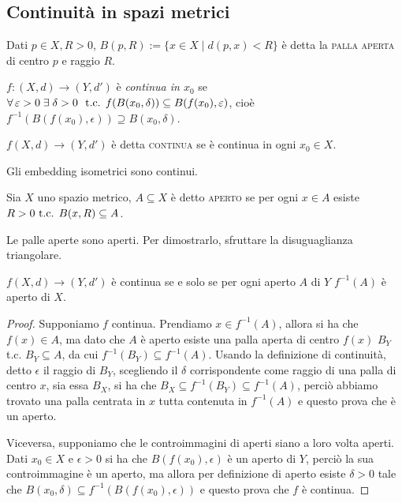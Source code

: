 \documentclass{article}
\begin{document}
\subsection{Continuità in spazi metrici}

\begin{defn}
    Dati $p \in X, R>0$, ${B(p, R):=\{ x \in X \mid d(p, x)<R\}}$ è detta la
    \textsc{palla aperta} di centro $p$ e raggio $R$.
\end{defn}

\begin{defn}
    ${f:(X, d) \rightarrow (Y, d')}$ è \textit{continua in $x_0$} se ${\forall
    \epsilon > 0 \; \exists \; \delta >0}\\\ \tc {f(B(x_0, \delta)) \subseteq
    B(f(x_0), \epsilon)}$, cioè ${f^{-1}(B(f(x_0), \epsilon)) \supseteq B(x_0,
    \delta)}$.
\end{defn}

\begin{defn}
    ${f(X, d) \rightarrow (Y, d')}$ è detta \textsc{continua} se è continua in
    ogni ${x_0 \in X}$.
\end{defn}

\begin{oss}
    Gli embedding isometrici sono continui.
\end{oss}

\begin{defn}
    Sia $X$ uno spazio metrico, $A \subseteq X$ è detto \textsc{aperto} se per
    ogni $x \in A$ esiste ${R>0 \text{ t.c. } B(x, R) \subseteq A}$.
\end{defn}

\begin{ftt}
    Le palle aperte sono aperti. Per dimostrarlo, sfruttare la disuguaglianza
    triangolare.
\end{ftt}

\begin{thm} \label{thm:cont_inv}
    $f(X, d) \rightarrow (Y, d')$ è continua se e solo se per ogni aperto $A$ di
    $Y$ $f^{-1}(A)$ è aperto di $X$.
\end{thm}

\begin{proof}
    Supponiamo $f$ continua. Prendiamo $x \in f^{-1}(A)$, allora si ha che $f(x)
    \in A$, ma dato che $A$ è aperto esiste una palla aperta di centro $f(x)$
    $B_Y$ t.c. $B_Y \subseteq A$, da cui $f^{-1}(B_Y) \subseteq f^{-1}(A)$.
    Usando la definizione di continuità, detto $\epsilon$ il raggio di $B_Y$,
    scegliendo il $\delta$ corrispondente come raggio di una palla di centro
    $x$, sia essa $B_X$, si ha che $B_X \subseteq f^{-1}(B_Y) \subseteq
    f^{-1}(A)$, perciò abbiamo trovato una palla centrata in $x$ tutta contenuta
    in $f^{-1}(A)$ e questo prova che è un aperto.

    Viceversa, supponiamo che le controimmagini di aperti siano a loro volta
    aperti. Dati $x_0 \in X$ e $\epsilon >0$ si ha che $B(f(x_0), \epsilon)$ è
    un aperto di $Y$, perciò la sua controimmagine è un aperto, ma allora per
    definizione di aperto esiste $\delta>0$ tale che $B(x_0, \delta) \subseteq
    f^{-1}(B(f(x_0), \epsilon))$ e questo prova che $f$ è continua.
\end{proof}
\end{document}
